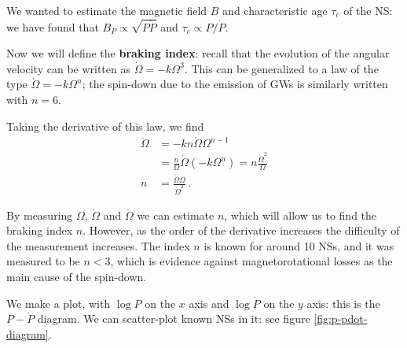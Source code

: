 \documentclass[main.tex]{subfiles}
\begin{document}

We wanted to estimate the magnetic field \(B\) and characteristic age \(\tau _c\) of the NS: we have found that \(B_P \propto \sqrt{P \dot{P}}\) and \(\tau _c \propto P / \dot{P}\).

Now we will define the \textbf{braking index}: recall that the evolution of the angular velocity can be written as \(\dot{\Omega} = - k \Omega^3\). 
This can be generalized to a law of the type \(\dot{\Omega} = -k \Omega^{n}\); the spin-down due to the emission of GWs is similarly written with \(n = 6\). 

Taking the derivative of this law, we find 
%
\begin{align}
\ddot{\Omega} &= - kn \dot{\Omega} \Omega^{n-1}  \\
&= \frac{n}{\Omega } \dot{\Omega} (-k \Omega^{n}) = n \frac{\dot{\Omega}^2}{\Omega }   \\
n &= \frac{\ddot{\Omega} \Omega }{\dot{\Omega}^2}
\,.
\end{align}

By measuring \(\Omega \), \(\dot{\Omega}\) and \(\ddot{\Omega}\) we can estimate \(n\), which will allow us to find the braking index \(n\).
However, as the order of the derivative increases the difficulty of the measurement increases. The index \(n\) is known for around 10 NSs, and it was measured to be \(n < 3\), which is evidence against magnetorotational losses as the main cause of the spin-down. 

We make a plot, with  \(\log P\) on the \(x\) axis and \(\log \dot{P}\) on the \(y\) axis: this is the \(P-\dot{P}\) diagram.
We can scatter-plot known NSs in it: see figure \ref{fig:p-pdot-diagram}.
\end{document}
